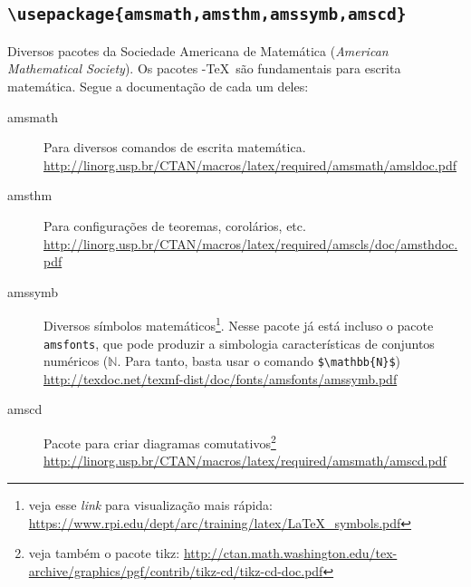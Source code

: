 \subsection*{\texttt{\textbackslash usepackage\{amsmath,amsthm,amssymb,amscd\}}}
Diversos pacotes da Sociedade Americana de Matemática (\emph{American 
Mathematical Society}).
Os pacotes \AmS-\TeX\ são fundamentais para escrita matemática.
Segue a documentação de cada um deles:
\begin{description}
	 \item[amsmath] Para diversos comandos de escrita matemática.\\
   {\small\url{http://linorg.usp.br/CTAN/macros/latex/required/amsmath/amsldoc.pdf}}
	 \item[amsthm]  Para configurações de teoremas, corolários, etc.\\
   {\small\url{http://linorg.usp.br/CTAN/macros/latex/required/amscls/doc/amsthdoc.pdf}}
	 \item[amssymb] Diversos símbolos matemáticos\footnote{veja esse \emph{link} 
   para visualização mais rápida: 
   \url{https://www.rpi.edu/dept/arc/training/latex/LaTeX_symbols.pdf}}.
   Nesse pacote já está incluso o pacote \texttt{amsfonts}, que pode produzir
   a simbologia características de conjuntos numéricos ($\mathbb{N}$.
   Para tanto,  basta usar o comando \verb|$\mathbb{N}$|)\\
   {\small\url{http://texdoc.net/texmf-dist/doc/fonts/amsfonts/amssymb.pdf}}
	 \item[amscd] Pacote para criar diagramas comutativos\footnote{veja também o 
   pacote tikz:
   \url{http://ctan.math.washington.edu/tex-archive/graphics/pgf/contrib/tikz-cd/tikz-cd-doc.pdf}}\\	
   {\small\url{http://linorg.usp.br/CTAN/macros/latex/required/amsmath/amscd.pdf}}
\end{description}

